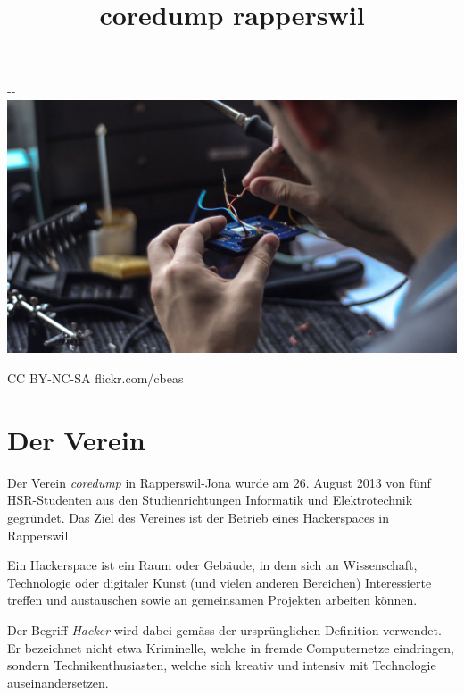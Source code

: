 \documentclass[10pt,a4paper,parskip,fleqn]{scrartcl}
\title{\Huge coredump rapperswil}
\begin{document}
\begin{titlepage}

	\maketitle

	\vspace{2cm}

	\begin{adjustwidth}{-\oddsidemargin-1in}{-\rightmargin-1in}
		\includegraphics[width=\paperwidth]{soldering.jpg}

		\vspace{-12mm}

		\hfill {\scriptsize \color{light-gray} CC BY-NC-SA flickr.com/cbeas}
	\end{adjustwidth}

	\vfill

\end{titlepage}

\section{Der Verein}

Der Verein \textit{coredump} in Rapperswil-Jona wurde am 26. August 2013 von
fünf HSR-Studenten aus den Studienrichtungen Informatik und Elektrotechnik
gegründet. Das Ziel des Vereines ist der Betrieb eines Hackerspaces in
Rapperswil.

Ein Hackerspace ist ein Raum oder Gebäude, in dem sich an Wissenschaft,
Technologie oder digitaler Kunst (und vielen anderen Bereichen) Interessierte
treffen und austauschen sowie an gemeinsamen Projekten arbeiten können.

Der Begriff \textit{Hacker} wird dabei gemäss der ursprünglichen Definition
verwendet. Er bezeichnet nicht etwa Kriminelle, welche in fremde Computernetze
eindringen, sondern Technikenthusiasten, welche sich kreativ und intensiv mit
Technologie auseinandersetzen.
\end{document}

